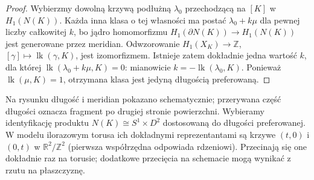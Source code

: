 \begin{proof}
Wybierzmy dowolną krzywą podłużną $\lambda_0$ przechodzącą
na $[K]$ w $H_1(N(K))$. Każda inna klasa o tej własności
ma postać $\lambda_0+k\mu$ dla pewnej liczby całkowitej $k$,
bo jądro homomorfizmu $H_1(\partial N(K))\to H_1(N(K))$
jest generowane przez meridian. Odwzorowanie
$H_1(X_K)\to\mathbb Z$, $[\gamma]\mapsto
\operatorname{lk}(\gamma,K)$, jest izomorfizmem.
Istnieje zatem dokładnie jedna wartość $k$, dla której
$\operatorname{lk}(\lambda_0+k\mu,K)=0$: mianowicie
$k=-\operatorname{lk}(\lambda_0,K)$.
Ponieważ $\operatorname{lk}(\mu,K)=1$, otrzymana
klasa jest jedyną długością preferowaną.
\end{proof}

\begin{center}
\end{center}

\begin{uwaga}
Na rysunku długość i meridian pokazano schematycznie;
przerywana część długości oznacza fragment po drugiej
stronie powierzchni. Wybieramy identyfikację produktu
$N(K)\cong S^1\times D^2$ dostosowaną do długości
preferowanej. W modelu ilorazowym torusa ich dokładnymi
reprezentantami są krzywe $(t,0)$ i $(0,t)$ w
$\mathbb R^2/\mathbb Z^2$ (pierwsza współrzędna
odpowiada rdzeniowi). Przecinają się one dokładnie raz
na torusie; dodatkowe przecięcia na schemacie mogą
wynikać z rzutu na płaszczyznę.
\end{uwaga}

